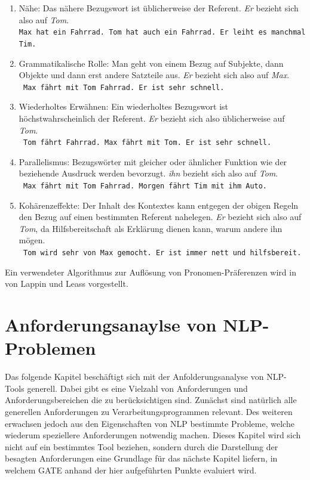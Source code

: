 \documentclass[12pt]{report}
\begin{document}
\begin{enumerate}
\item Nähe: Das nähere Bezugswort ist üblicherweise der Referent. \textit{\glqq  Er\grqq{}} bezieht sich also auf \textit{Tom}.\\
\tt Max hat ein Fahrrad. Tom hat auch ein Fahrrad. Er leiht es manchmal Tim.
\rm
\item Grammatikalische Rolle: Man geht von einem Bezug auf Subjekte, dann Objekte und dann erst andere Satzteile aus. \textit{\glqq  Er\grqq{}} bezieht sich also auf \textit{Max}.\\
\tt
Max fährt mit Tom Fahrrad. Er ist sehr schnell.
\rm
\item Wiederholtes Erwähnen: Ein wiederholtes Bezugswort ist höchstwahrscheinlich der Referent. \textit{\glqq  Er\grqq{}} bezieht sich also üblicherweise auf \textit{Tom}.\\
\tt
Tom fährt Fahrrad. Max fährt mit Tom. Er ist sehr schnell.
\rm
\item Parallelismus: Bezugswörter mit gleicher oder ähnlicher Funktion wie der beziehende Ausdruck werden bevorzugt. \textit{\glqq  ihn\grqq{}} bezieht sich also auf \textit{Tom}. \\
\tt
Max fährt mit Tom Fahrrad. Morgen fährt Tim mit ihm Auto.
\rm
\item Kohärenzeffekte: Der Inhalt des Kontextes kann entgegen der obigen Regeln den Bezug auf einen bestimmten Referent nahelegen. \textit{\glqq  Er\grqq{}} bezieht sich also auf \textit{Tom}, da Hilfsbereitschaft als Erklärung dienen kann, warum andere ihn mögen.\\
\tt
Tom wird sehr von Max gemocht. Er ist immer nett und hilfsbereit.
\rm
\end{enumerate}
Ein verwendeter Algorithmus zur Auflösung von Pronomen-Präferenzen wird in \cite{ll94} von Lappin und Leass vorgestellt.\\

\chapter{Anforderungsanaylse von NLP-Problemen}
Das folgende Kapitel beschäftigt sich mit der Anfolderungsanalyse von NLP-Tools generell. Dabei gibt es eine Vielzahl von Anforderungen und Anforderungsbereichen die zu berücksichtigen sind. Zunächst sind natürlich alle generellen Anforderungen zu Verarbeitungsprogrammen relevant. Des weiteren erwachsen jedoch aus den Eigenschaften von NLP bestimmte Probleme, welche wiederum speziellere Anforderungen notwendig machen. Dieses Kapitel wird sich nicht auf ein bestimmtes Tool beziehen, sondern durch die Darstellung der besagten Anforderungen eine Grundlage für das nächste Kapitel liefern, in welchem GATE anhand der hier aufgeführten Punkte evaluiert wird. 
\end{document}
